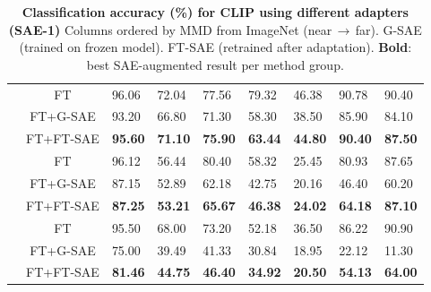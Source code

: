 
\begin{table}[bht] %
\centering
\caption{\textbf{Classification accuracy (\%) for CLIP using different adapters (SAE-1)}
Columns ordered by MMD from ImageNet (near\,\(\to\)\,far).
G-SAE (trained on frozen model).
FT-SAE (retrained after adaptation).
\textbf{Bold}: best SAE-augmented result per method group.}
\label{tab:clip_maple_tap_sae1}
\setlength{\tabcolsep}{3pt}
\renewcommand{\arraystretch}{0.9}
\footnotesize
\begin{tabular}{lc A E H K L M O}
\toprule
{} & 
  & 
  & 
  & 
  & 
  & 
  & 
  &  \\
\midrule
{}
  & FT              & 96.06 & 72.04 & 77.56 & 79.32 & 46.38 & 90.78 & 90.40 \\
  & FT+G-SAE        & 93.20 & 66.80 & 71.30 & 58.30 & 38.50 & 85.90 & 84.10 \\
  & FT+FT-SAE       & \bf 95.60 & \bf 71.10 & \bf 75.90 & \bf 63.44 & \bf 44.80 & \bf 90.40 & \bf 87.50 \\
\midrule
{}
  & FT              & 96.12 & 56.44 & 80.40 & 58.32 & 25.45 & 80.93 & 87.65 \\
  & FT+G-SAE        & 87.15 & 52.89 & 62.18 & 42.75 & 20.16 & 46.40 & 60.20 \\
  & FT+FT-SAE       & \bf 87.25 & \bf 53.21 & \bf 65.67 & \bf 46.38 & \bf 24.02 & \bf 64.18 & \bf 87.10 \\
\midrule
{}
  & FT              & 95.50 & 68.00 & 73.20 & 52.18 & 36.50 & 86.22 & 90.90 \\
  & FT+G-SAE        & 75.00 & 39.49 & 41.33 & 30.84 & 18.95 & 22.12 & 11.30 \\
  & FT+FT-SAE       & \bf 81.46 & \bf 44.75 & \bf 46.40 & \bf 34.92 & \bf 20.50 & \bf 54.13 & \bf 64.00 \\
\bottomrule
\end{tabular}
\end{table}